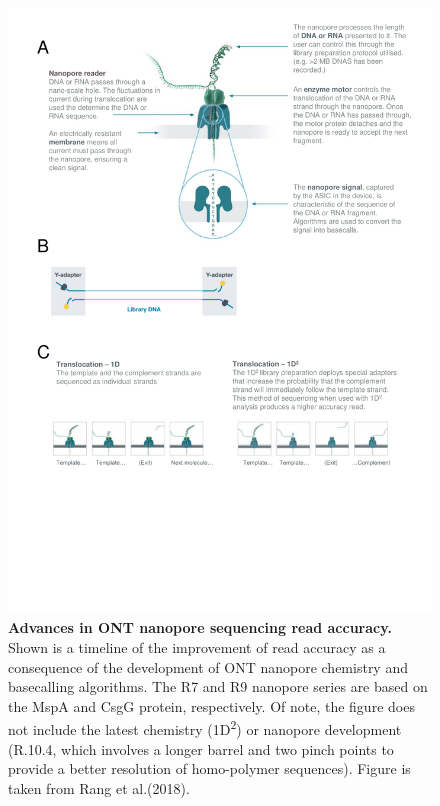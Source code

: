 \begin{figure}[h]
	\centering
	\includegraphics[page=2,trim={0 19cm 0 0},clip, scale = 0.8]{Figures/ProjectDevelopment_FiguresONT}
	\captionsetup{width=0.95\textwidth}
	\caption[Advances in ONT nanopore sequencing read accuracy]%
	{\textbf{Advances in ONT nanopore sequencing read accuracy.} Shown is a timeline of the improvement of read accuracy as a consequence of the development of ONT nanopore chemistry and basecalling algorithms. The R7 and R9 nanopore series are based on the MspA and CsgG protein, respectively. Of note, the figure does not include the latest chemistry (1D\textsuperscript{2}) or nanopore development (R.10.4, which involves a longer barrel and two pinch points to provide a better resolution of homo-polymer sequences). Figure is taken from Rang et al.(2018)\cite{Rang2018}.}
	\label{fig:ONT_advances}
\end{figure}

